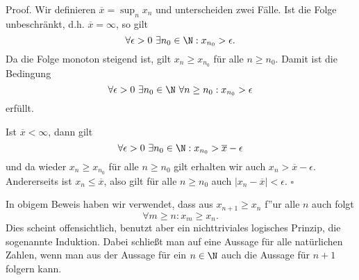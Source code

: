 \documentclass[letterpaper,10pt,english]{jupyterBook}
\begin{document}
\begin{emphBox}{}{}
Proof. Wir definieren \(\overline{x}= \sup_n x_n\) und unterscheiden zwei Fälle. Ist die Folge unbeschränkt, d.h. \(\overline{x}=\infty\), so gilt
\begin{equation*}
 \forall \epsilon > 0~\exists n_0 \in \N: x_{n_0} > \epsilon.\end{equation*}
Da die Folge monoton steigend ist, gilt \(x_n \geq x_{n_0}\) für alle \(n \geq n_0\). Damit ist die Bedingung
\begin{equation*}
 \forall \epsilon > 0~\exists n_0 \in \N~\forall n\geq n_0: x_{n_0} > \epsilon \end{equation*}
erfüllt.

Ist \(\overline{x} < \infty\), dann gilt
\begin{equation*}
 \forall \epsilon > 0~\exists n_0 \in \N: x_{n_0} > \overline{x} -\epsilon
\end{equation*}
und da wieder \(x_n \geq x_{n_0}\) für alle \(n \geq n_0\) gilt erhalten wir auch \( x_n > \overline{x}-\epsilon\). Andererseits ist \(x_n \leq \overline{x}\), also gilt für alle \(n \geq n_0\) auch \( \vert x_n - \overline{x} \vert < \epsilon. \)  \(\square\)
\end{emphBox}

In obigem Beweis haben wir verwendet, dass aus \(x_{n+1} \geq x_n\) f”ur alle \(n\) auch folgt
\begin{equation*}
 \forall m \geq n: x_m \geq x_n.\end{equation*}
Dies scheint offensichtlich, benutzt aber ein nichttriviales logisches Prinzip, die sogenannte Induktion. Dabei schließt man auf eine Aussage für alle natürlichen Zahlen, wenn man aus der Aussage für ein \(n \in \N\) auch die Aussage für \(n+1\) folgern kann.
\end{document}
